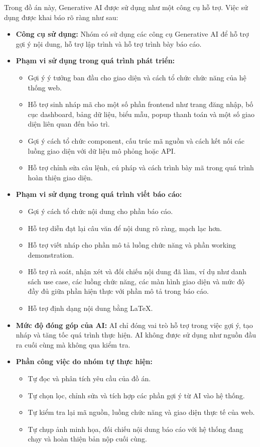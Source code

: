 Trong đồ án này, Generative AI được sử dụng như một công cụ hỗ trợ. Việc sử dụng được khai báo rõ ràng như sau:

\begin{itemize}
	\item \textbf{Công cụ sử dụng:} Nhóm có sử dụng các công cụ Generative AI để hỗ trợ gợi ý nội dung, hỗ trợ lập trình và hỗ trợ trình bày báo cáo.
	
	\item \textbf{Phạm vi sử dụng trong quá trình phát triển:}
	\begin{itemize}
		\item Gợi ý ý tưởng ban đầu cho giao diện và cách tổ chức chức năng của hệ thống web.
		\item Hỗ trợ sinh nháp mã cho một số phần frontend như trang đăng nhập, bố cục dashboard, bảng dữ liệu, biểu mẫu, popup thanh toán và một số giao diện liên quan đến bảo trì.
		\item Gợi ý cách tổ chức component, cấu trúc mã nguồn và cách kết nối các luồng giao diện với dữ liệu mô phỏng hoặc API.
		\item Hỗ trợ chỉnh sửa câu lệnh, cú pháp và cách trình bày mã trong quá trình hoàn thiện giao diện.
	\end{itemize}
	
	\item \textbf{Phạm vi sử dụng trong quá trình viết báo cáo:}
	\begin{itemize}
		\item Gợi ý cách tổ chức nội dung cho phần báo cáo.
		\item Hỗ trợ diễn đạt lại câu văn để nội dung rõ ràng, mạch lạc hơn.
		\item Hỗ trợ viết nháp cho phần mô tả luồng chức năng và phần working demonstration.
		\item Hỗ trợ rà soát, nhận xét và đối chiếu nội dung đã làm, ví dụ như danh sách use case, các luồng chức năng, các màn hình giao diện và mức độ đầy đủ giữa phần hiện thực với phần mô tả trong báo cáo.
		\item Hỗ trợ định dạng nội dung bằng \LaTeX{}.
	\end{itemize}
	
	\item \textbf{Mức độ đóng góp của AI:} AI chỉ đóng vai trò hỗ trợ trong việc gợi ý, tạo nháp và tăng tốc quá trình thực hiện. AI không được sử dụng như nguồn đầu ra cuối cùng mà không qua kiểm tra.
	
	\item \textbf{Phần công việc do nhóm tự thực hiện:}
	\begin{itemize}
		\item Tự đọc và phân tích yêu cầu của đồ án.
		\item Tự chọn lọc, chỉnh sửa và tích hợp các phần gợi ý từ AI vào hệ thống.
		\item Tự kiểm tra lại mã nguồn, luồng chức năng và giao diện thực tế của web.
		\item Tự chụp ảnh minh họa, đối chiếu nội dung báo cáo với hệ thống đang chạy và hoàn thiện bản nộp cuối cùng.
	\end{itemize}
	

\end{itemize}
